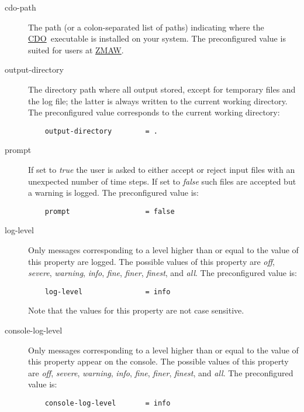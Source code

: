 \documentclass[
square
,pdftex
]{refrep}
\newcommand{\cdo}{\href{http://www.mpimet.mpg.de/cdo/}{CDO}}
\newcommand{\zmaw}{\href{http://www.zmaw.de/}{ZMAW}}
\begin{document}
\begin{description}

\item[cdo-path]
The path (or a colon-separated list of paths) indicating where the \cdo\
executable is installed on your system. The preconfigured value is suited
for users at \zmaw.

\item[output-directory]
The directory path where all output stored, except for temporary files and
the log file; the latter is always written to the current working directory.
The preconfigured value corresponds to the current working directory:
 
\begin{verbatim}
    output-directory        = .
\end{verbatim}

\item[prompt]
If set to \emph{true} the user is asked to either accept or reject input
files with an unexpected number of time steps. If set to \emph{false} such
files are accepted but a warning is logged. The preconfigured value is:

\begin{verbatim}
    prompt                  = false
\end{verbatim}

\item[log-level]
Only messages corresponding to a level higher than or equal to the value of
this property are logged. The possible values of this property are \emph{off},
\emph{severe}, \emph{warning}, \emph{info}, \emph{fine}, \emph{finer},
\emph{finest}, and \emph{all}. The preconfigured value is:

\begin{verbatim}
    log-level               = info
\end{verbatim}

Note that the values for this property are not case sensitive.

\item[console-log-level]
Only messages corresponding to a level higher than or equal to the value of
this property appear on the console. The possible values of this property are
\emph{off}, \emph{severe}, \emph{warning}, \emph{info}, \emph{fine},
\emph{finer}, \emph{finest}, and \emph{all}. The preconfigured value is:

\begin{verbatim}
    console-log-level       = info
\end{verbatim}


\end{description}
\end{document}
